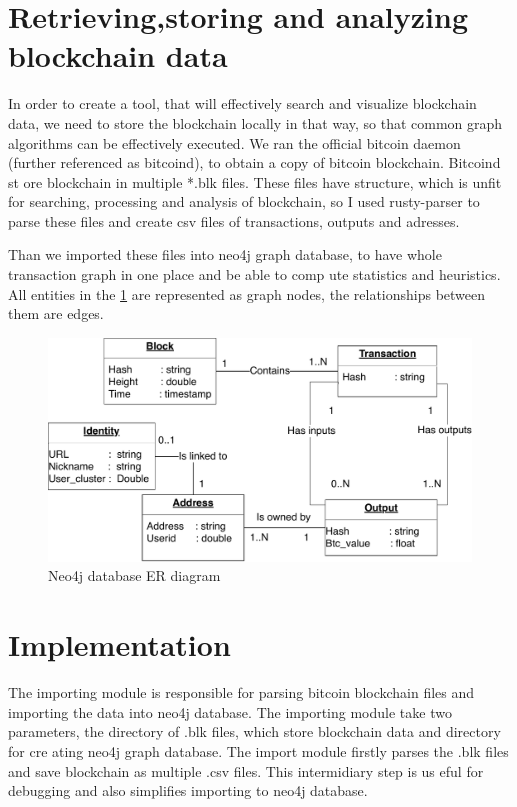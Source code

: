 \documentclass[
  digital, %
  table,   %
  lof,     %
  lot,     %
  oneside
]{fithesis3}
\begin{document}
\section{Retrieving,storing and analyzing blockchain data}
In order to create a tool, that will effectively search and visualize blockchain data,
we need to store the blockchain locally in that way, so that common graph algorithms can be effectively executed.
We ran the official bitcoin daemon (further referenced as bitcoind), to obtain a copy of bitcoin blockchain. Bitcoind st
ore blockchain in multiple *.blk files.
These files have structure, which is unfit for searching, processing and analysis of blockchain, so I used rusty-parser 
to parse these files and create csv files of transactions, outputs and adresses.

Than we imported these files into neo4j graph database, to have whole transaction graph in one place and be able to comp
ute statistics and heuristics.
All entities in the \ref{neo4jschema} are represented as graph nodes, the relationships between them are edges.
\begin{figure}[!htb]
    \centering
    \includegraphics[width=1\textwidth]{neo4j-schema}
    \caption{Neo4j database ER diagram}
    \label{neo4jschema}
\end{figure}

\section{Implementation}

The importing module is responsible for parsing bitcoin blockchain files and importing the data into neo4j database.
The importing module take two parameters, the directory of .blk files, which store blockchain data and directory for cre
ating neo4j graph database.
The import module firstly parses the .blk files and save blockchain as multiple .csv files. This intermidiary step is us
eful for debugging and also simplifies importing to neo4j database.
\end{document}
